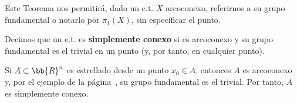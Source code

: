 Este Teorema nos permitirá, dado un e.t. $X$ arcoconexo, referirnos a su grupo fundamental o notarlo por $\pi_1(X)$, sin especificar el punto.

\begin{definicion}
    Decimos que un e.t. es \textbf{simplemente conexo} si es arcoconexo y su grupo fundamental es el trivial en un punto (y, por tanto, en cualquier punto).
\end{definicion}

\begin{ejemplo}
    Si $A\subset \bb{R}^n$ es estrellado desde un punto $x_0\in A$, entonces $A$ es arcoconexo y, por el ejemplo de la página~\pageref{ej:grupo_fundamental_estrellado}, su grupo fundamental es el trivial. Por tanto, $A$ es simplemente conexo.
\end{ejemplo}

